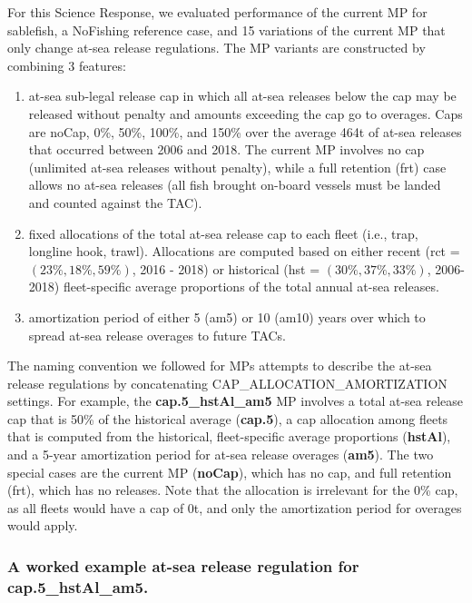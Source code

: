 \documentclass[11pt]{book}
\begin{document}
For this Science Response, we evaluated performance of the current MP for sablefish, a NoFishing reference case, and 15 variations of the current MP that only change at-sea release regulations. The MP variants are constructed by combining 3 features:
\begin{enumerate}
\def\labelenumi{\arabic{enumi}.}

\item
  at-sea sub-legal release cap in which all at-sea releases below the cap may be released without penalty and amounts exceeding the cap go to overages. Caps are noCap, 0\%, 50\%, 100\%, and 150\% over the average 464t of at-sea releases that occurred between 2006 and 2018. The current MP involves no cap (unlimited at-sea releases without penalty), while a full retention (frt) case allows no at-sea releases (all fish brought on-board vessels must be landed and counted against the TAC).
\item
  fixed allocations of the total at-sea release cap to each fleet (i.e., trap, longline hook, trawl). Allocations are computed based on either recent (rct = \((23\%, 18\%, 59\%)\), 2016 - 2018) or historical (hst = \((30\%, 37\%, 33\%)\), 2006-2018) fleet-specific average proportions of the total annual at-sea releases.
\item
  amortization period of either 5 (am5) or 10 (am10) years over which to spread at-sea release overages to future TACs.
\end{enumerate}
The naming convention we followed for MPs attempts to describe the at-sea release regulations by concatenating CAP\_ALLOCATION\_AMORTIZATION settings. For example, the \textbf{cap.5\_hstAl\_am5} MP involves a total at-sea release cap that is 50\% of the historical average (\textbf{cap.5}), a cap allocation among fleets that is computed from the historical, fleet-specific average proportions (\textbf{hstAl}), and a 5-year amortization period for at-sea release overages (\textbf{am5}). The two special cases are the current MP (\textbf{noCap}), which has no cap, and full retention (frt), which has no releases. Note that the allocation is irrelevant for the 0\% cap, as all fleets would have a cap of 0t, and only the amortization period for overages would apply.

\hypertarget{a-worked-example-at-sea-release-regulation-for-cap.5_hstal_am5.}{%
\subsubsection{\texorpdfstring{A worked example at-sea release regulation for \textbf{cap.5\_hstAl\_am5}.}{A worked example at-sea release regulation for cap.5\_hstAl\_am5.}}\label{a-worked-example-at-sea-release-regulation-for-cap.5_hstal_am5.}}
\end{document}
